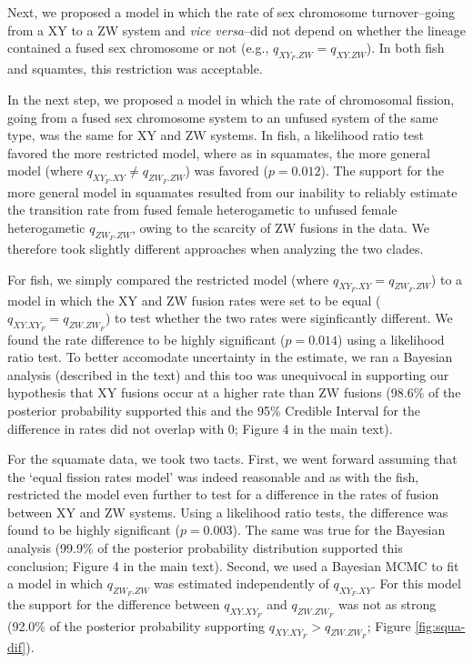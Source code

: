 \documentclass[12pt,twoside]{article}
\begin{document}
Next, we proposed a model in which the rate of sex chromosome turnover--going from a XY to a ZW system and \emph{vice versa}--did not depend on whether the lineage contained a fused sex chromosome or not (e.g., $q_{XY_F.ZW} = q_{XY.ZW}$). In both fish and squamtes, this restriction was acceptable.

In the next step, we proposed a model in which the rate of chromosomal fission, going from a fused sex chromosome system to an unfused system of the same type, was the same for XY and ZW systems. In fish, a likelihood ratio test favored the more restricted model, where as in squamates, the more general model (where $q_{XY_F.XY} \neq q_{ZW_F.ZW}$) was favored ($p=\text{0.012}$). The support for the more general model in squamates resulted from our inability to reliably estimate the transition rate from fused female heterogametic to unfused female heterogametic $q_{ZW_F.ZW}$, owing to the scarcity of ZW fusions in the data. We therefore took slightly different approaches when analyzing the two clades.

For fish, we simply compared the restricted model (where $q_{XY_F.XY} = q_{ZW_F.ZW}$) to a model in which the XY and ZW fusion rates were set to be equal ($q_{XY.XY_F}=q_{ZW.ZW_F}$) to test whether the two rates were siginficantly different. We found the rate difference to be highly significant ($p=\text{0.014}$) using a likelihood ratio test. To better accomodate uncertainty in the estimate, we ran a Bayesian analysis (described in the text) and this too was unequivocal in supporting our hypothesis that XY fusions occur at a higher rate than ZW fusions (98.6\% of the posterior probability supported this and the 95\% Credible Interval for the difference in rates did not overlap with 0; Figure 4 in the main text).

For the squamate data, we took two tacts. First, we went forward assuming that the `equal fission rates model' was indeed reasonable and as with the fish, restricted the model even further to test for a difference in the rates of fusion between XY and ZW systems. Using a likelihood ratio tests, the difference was found to be highly significant ($p=\text{0.003}$). The same was true for the Bayesian analysis (99.9\% of the posterior probability distribution supported this conclusion; Figure 4 in the main text). Second, we used a Bayesian MCMC to fit a model in which $q_{ZW_F.ZW}$ was estimated independently of $q_{XY_F.XY}$. For this model the support for the difference between $q_{XY.XY_F}$ and $q_{ZW.ZW_F}$ was not as strong (92.0\% of the posterior probability supporting $q_{XY.XY_F} > q_{ZW.ZW_F}$; Figure \ref{fig:squa-dif}).
\end{document}
